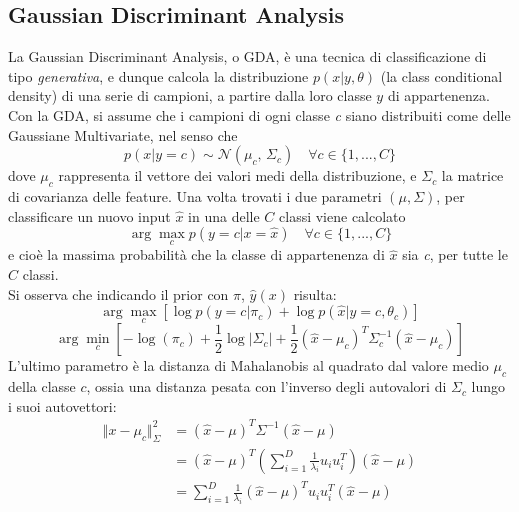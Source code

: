\documentclass[a4paper,8pt]{article}
\begin{document}
\begin{multicols}{2}
\section{Gaussian Discriminant Analysis}
La Gaussian Discriminant Analysis, o GDA, è una tecnica di classificazione di tipo \emph{generativa}, e dunque calcola la distribuzione $p(x | y, \theta)$ (la class conditional density) di una serie di campioni, a partire dalla loro classe $y$ di appartenenza. Con la GDA, si assume che i campioni di ogni classe \emph{c} siano distribuiti come delle Gaussiane Multivariate, nel senso che
\begin{equation}
p(x|y=c) \sim \mathcal{N}(\mu_{c},\,\Sigma_{c})\quad \forall{c} \in \{1, ..., C\}
\end{equation}
dove $\mu_{c}$ rappresenta il vettore dei valori medi della distribuzione, e $\Sigma_{c}$ la matrice di covarianza delle feature.
Una volta trovati i due parametri $(\mu, \Sigma)$, per classificare un nuovo input $\hat{x}$ in una delle $C$ classi viene calcolato
\begin{equation}
\arg\max_{c}p(y = c|x = \hat{x}) \quad \forall{c} \in \{1, ..., C\}
\end{equation}
e cioè la massima probabilità che la classe di appartenenza di $\hat{x}$ sia \emph{c}, per tutte le $C$ classi.\\
Si osserva che indicando il prior con $\pi$, $\hat{y}(x)$ risulta:
\begin{equation}
\arg\max_{c}[\log{p(y=c|\pi_{c})} + \log{p(\hat{x}|y=c, \theta_{c})}]
\end{equation}
\begin{equation}
\arg\min_{c}[-\log{(\pi_{c})}+\frac{1}{2}\log{|\Sigma_{c}|} + \frac{1}{2}(\hat{x} - \mu_{c})^{T}\Sigma_{c}^{-1}(\hat{x} - \mu_{c})]
\end{equation}
L'ultimo parametro è la distanza di Mahalanobis al quadrato dal valore medio $\mu_{c}$ della classe $c$, ossia una distanza pesata con l'inverso degli autovalori di $\Sigma_{c}$ lungo i suoi autovettori:
\begin{equation}
\begin{split}
\Vert{x-\mu_{c}}\Vert_{\Sigma}^{2} &= (\hat{x} - \mu)^{T}\Sigma^{-1}(\hat{x} - \mu)\\
&=(\hat{x} - \mu)^{T}(\sum_{i=1}^{D} \frac{1}{\lambda_{i}}u_{i}u_{i}^{T})(\hat{x} - \mu)\\
&=\sum_{i=1}^{D} \frac{1}{\lambda_{i}}(\hat{x} - \mu)^{T}u_{i}u_{i}^{T}(\hat{x} - \mu)\\

\end{split}
\end{equation}
\end{multicols}
\end{document}
